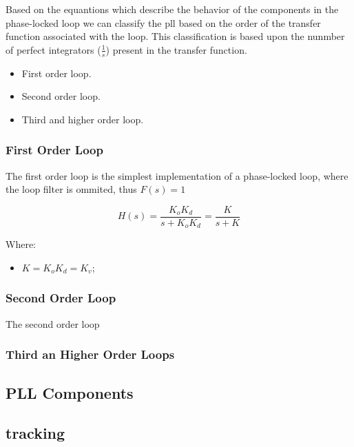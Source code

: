 Based on the equantions which describe the behavior of the components in the 
phase-locked loop we can classify the pll based on the order of the transfer 
function associated with the loop. This classification is based upon the nunmber 
of perfect integrators ($\frac{1}{s}$) present in the transfer function.

\begin{itemize}
    \item First order loop.
    \item Second order loop.
    \item Third and higher order loop.
\end{itemize}

\subsubsection{First Order Loop}

The first order loop is the simplest implementation of a phase-locked loop,
where the loop filter is ommited, thus $F(s)=1$

\begin{equation}
    H(s)= \frac{K_oK_d}{s + K_oK_d}=
    \frac{K}{s + K}
    \label{eq:tf1st}
\end{equation}

Where:
\begin{itemize}
    \item $K = K_oK_d =K_v$;
\end{itemize}

\subsubsection{Second Order Loop}

The second order loop

\subsubsection{Third an Higher Order Loops }

\subsection{PLL Components}

\subsection{tracking}




